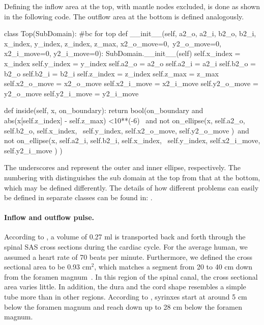 Defining the inflow area at the top, with mantle nodes excluded, is done as shown in the following code. The outflow area at the bottom is defined analogously.

\begin{python}
class Top(SubDomain):	#bc for top
	def __init__(self, a2_o, a2_i, b2_o, b2_i,  x_index, y_index, z_index, z_max, x2_o_move=0,\
				 y2_o_move=0, x2_i_move=0, y2_i_move=0):
		SubDomain.__init__(self)
		self.x_index = x_index
		self.y_index = y_index
		self.a2_o = a2_o
		self.a2_i = a2_i
		self.b2_o = b2_o
		self.b2_i = b2_i
		self.z_index = z_index
		self.z_max = z_max
		self.x2_o_move = x2_o_move
		self.x2_i_move = x2_i_move
		self.y2_o_move = y2_o_move
		self.y2_i_move = y2_i_move

	def inside(self, x, on_boundary):
		return bool(on_boundary and abs(x[self.z_index] - self.z_max) <10**(-6) \
                       and not on_ellipse(x, self.a2_o, self.b2_o, self.x_index,  \
                           self.y_index, self.x2_o_move, self.y2_o_move )\
                       and not on_ellipse(x, self.a2_i, self.b2_i, self.x_index, \
                           self.y_index, self.x2_i_move, self.y2_i_move ) )
\end{python}

The underscores \emp{o} and \emp{i} represent the outer and inner
ellipse, respectively. The numbering with \emp{2} distinguishes the sub
domain at the top from that at the bottom, which may be defined
differently. The details of how different problems can easily be
defined in separate classes can be found in:
\emp{src/mesh\_definitions/}. %

\paragraph{Inflow and outflow pulse.} According to \cite{Gupta2009}, a volume of 0.27 ml is transported back and forth through the spinal SAS cross sections during the cardiac cycle. For the average human, we assumed a heart rate of 70 beats per minute. Furthermore, we defined the cross sectional area to be 0.93 $\mathrm{cm^2}$, which matches a segment from 20 to 40 cm down from the foramen magnum~\cite{Loth2001}. In this region of the spinal canal, the cross sectional area varies little. In addition, the dura and the cord shape resembles a simple tube more than in other regions. According to \cite{Oldfield1994}, syrinxes start at around 5 cm below the foramen magnum and reach down up to 28 cm below the foramen magnum.

